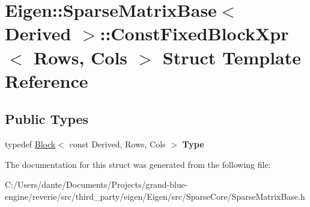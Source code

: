 \hypertarget{struct_eigen_1_1_sparse_matrix_base_1_1_const_fixed_block_xpr}{}\section{Eigen\+::Sparse\+Matrix\+Base$<$ Derived $>$\+::Const\+Fixed\+Block\+Xpr$<$ Rows, Cols $>$ Struct Template Reference}
\label{struct_eigen_1_1_sparse_matrix_base_1_1_const_fixed_block_xpr}
\subsection*{Public Types}
\begin{DoxyCompactItemize}
\item 
\mbox{\label{struct_eigen_1_1_sparse_matrix_base_1_1_const_fixed_block_xpr_afdc6cb19cc884653a1eb1a1d2aafe551}} 
typedef \mbox{\hyperlink{class_eigen_1_1_block}{Block}}$<$ const Derived, Rows, Cols $>$ {\bfseries Type}
\end{DoxyCompactItemize}


The documentation for this struct was generated from the following file\+:\begin{DoxyCompactItemize}
\item 
C\+:/\+Users/dante/\+Documents/\+Projects/grand-\/blue-\/engine/reverie/src/third\+\_\+party/eigen/\+Eigen/src/\+Sparse\+Core/Sparse\+Matrix\+Base.\+h\end{DoxyCompactItemize}

